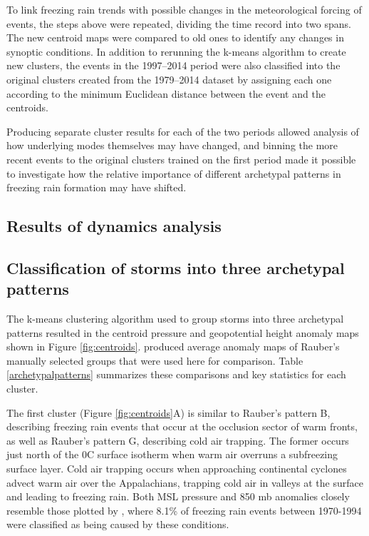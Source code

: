 \documentclass[twocol]{ametsoc}
\begin{document}
To link freezing rain trends with possible changes in the meteorological forcing of events, the steps above were repeated, dividing the time record into two spans. The new centroid maps were compared to old ones to identify any changes in synoptic conditions. In addition to rerunning the k-means algorithm to create new clusters, the events in the 1997--2014 period were also classified into the original clusters created from the 1979--2014 dataset by assigning each one according to the minimum Euclidean distance between the event and the centroids. 

Producing separate cluster results for each of the two periods allowed analysis of how underlying modes themselves may have changed, and binning the more recent events to the original clusters trained on the first period made it possible to investigate how the relative importance of different archetypal patterns in freezing rain formation may have shifted.

\subsection{Results of dynamics analysis}
\subsection{Classification of storms into three archetypal patterns}
The k-means clustering algorithm used to group storms into three archetypal patterns resulted in the centroid pressure and geopotential height anomaly maps shown in Figure \ref{fig:centroids}. \citet{erfani2012automated} produced average anomaly maps of Rauber's manually selected groups that were used here for comparison. Table \ref{archetypalpatterns} summarizes these comparisons and key statistics for each cluster.

The first cluster (Figure \ref{fig:centroids}A) is similar to Rauber's pattern B, describing freezing rain events that occur at the occlusion sector of warm fronts, as well as Rauber's pattern G, describing cold air trapping. The former occurs just north of the 0\degree C surface isotherm when warm air overruns a subfreezing surface layer. Cold air trapping occurs when approaching continental cyclones advect warm air over the Appalachians, trapping cold air in valleys at the surface and leading to freezing rain. Both MSL pressure and 850 mb anomalies closely resemble those plotted by \citet{rauber2001synoptic}, where  8.1\% of freezing rain events between 1970-1994 were classified as being caused by these conditions. 
\end{document}
